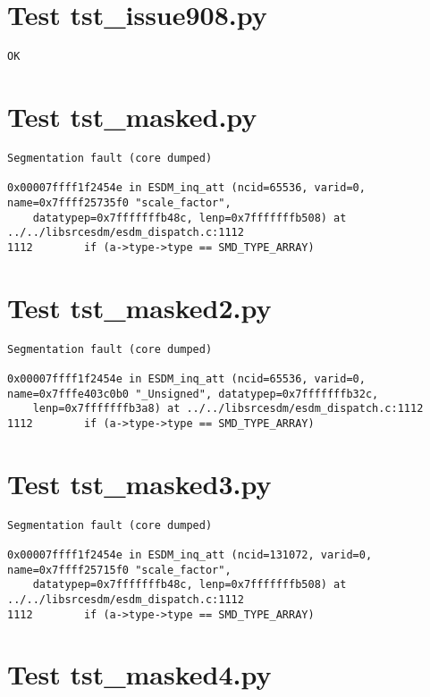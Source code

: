 \section{Test tst\_issue908.py}

\begin{verbatim}
OK
\end{verbatim}

\section{Test tst\_masked.py}

\begin{verbatim}
Segmentation fault (core dumped)

0x00007ffff1f2454e in ESDM_inq_att (ncid=65536, varid=0, name=0x7ffff25735f0 "scale_factor",
    datatypep=0x7fffffffb48c, lenp=0x7fffffffb508) at ../../libsrcesdm/esdm_dispatch.c:1112
1112	    if (a->type->type == SMD_TYPE_ARRAY)
\end{verbatim}

\section{Test tst\_masked2.py}

\begin{verbatim}
Segmentation fault (core dumped)

0x00007ffff1f2454e in ESDM_inq_att (ncid=65536, varid=0, name=0x7fffe403c0b0 "_Unsigned", datatypep=0x7fffffffb32c,
    lenp=0x7fffffffb3a8) at ../../libsrcesdm/esdm_dispatch.c:1112
1112	    if (a->type->type == SMD_TYPE_ARRAY)
\end{verbatim}

\section{Test tst\_masked3.py}

\begin{verbatim}
Segmentation fault (core dumped)

0x00007ffff1f2454e in ESDM_inq_att (ncid=131072, varid=0, name=0x7ffff25715f0 "scale_factor",
    datatypep=0x7fffffffb48c, lenp=0x7fffffffb508) at ../../libsrcesdm/esdm_dispatch.c:1112
1112	    if (a->type->type == SMD_TYPE_ARRAY)
\end{verbatim}

\section{Test tst\_masked4.py}


